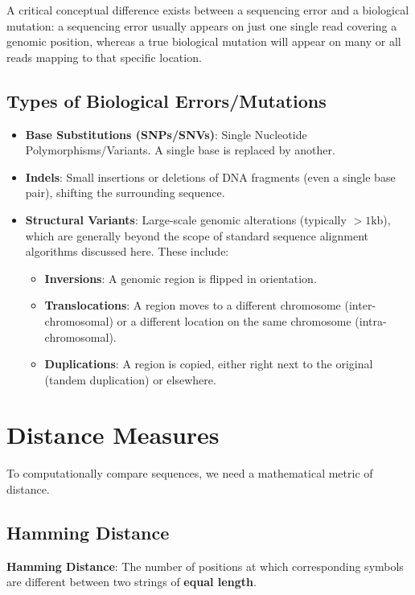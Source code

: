 \sta A critical conceptual difference exists between a sequencing error and a biological mutation: a sequencing error usually appears on just one single read covering a genomic position, whereas a true biological mutation will appear on many or all reads mapping to that specific location.

\subsection{Types of Biological Errors/Mutations}

\begin{itemize}
    \item \textbf{Base Substitutions (SNPs/SNVs)}: Single Nucleotide Polymorphisms/Variants. A single base is replaced by another.
    \item \textbf{Indels}: Small insertions or deletions of DNA fragments (even a single base pair), shifting the surrounding sequence.
    \item \textbf{Structural Variants}: Large-scale genomic alterations (typically $>1\text{kb}$), which are generally beyond the scope of standard sequence alignment algorithms discussed here. These include:
    \begin{itemize}
        \item \textbf{Inversions}: A genomic region is flipped in orientation.
        \item \textbf{Translocations}: A region moves to a different chromosome (inter-chromosomal) or a different location on the same chromosome (intra-chromosomal).
        \item \textbf{Duplications}: A region is copied, either right next to the original (tandem duplication) or elsewhere.
    \end{itemize}
\end{itemize}

\section{Distance Measures}

To computationally compare sequences, we need a mathematical metric of distance.

\subsection{Hamming Distance}

\begin{important}
    \textbf{Hamming Distance}: The number of positions at which corresponding symbols are different between two strings of \textbf{equal length}.
\end{important}

